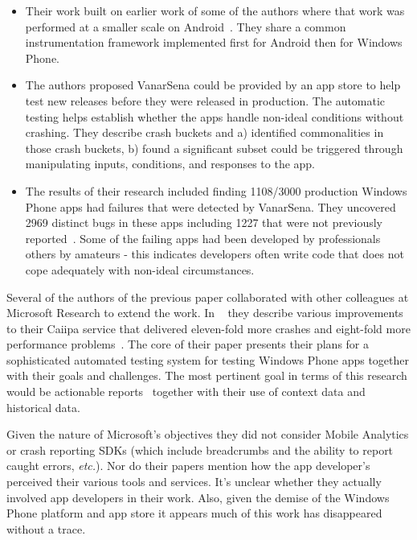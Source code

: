 \begin{itemize}
    \item Their work built on earlier work of some of the authors where that work was performed at a smaller scale on Android~\cite{ravindrath2012_appinsight_mobile_app_performance_in_the_wild}. They share a common instrumentation framework implemented first for Android then for Windows Phone.
    \item The authors proposed VanarSena could be provided by an app store to help test new releases before they were released in production. The automatic testing helps establish whether the apps handle non-ideal conditions without crashing.
    They describe crash buckets and a) identified commonalities in those crash buckets, b) found a significant subset could be triggered through manipulating inputs, conditions, and responses to the app.
    \item The results of their research included finding 1108/3000 production Windows Phone apps had failures that were detected by VanarSena. They uncovered 2969 distinct bugs in these apps including 1227 that were not previously reported~\cite[p. 202]{ravindrath2014_automatic_and_scalable_fault_detection_for_mobile_apps}. Some of the failing apps had been developed by professionals others by amateurs - this indicates developers often write code that does not cope adequately with non-ideal circumstances.  
\end{itemize}

Several of the authors of the previous paper collaborated with other colleagues at Microsoft Research to extend the work. In ~\textcite{chandra2015_how_to_smash_the_next_billion_mobile_app_bugs} they describe various improvements to their Caiipa service that delivered eleven-fold more crashes and eight-fold more performance problems~\cite[pp. 37-38]{chandra2015_how_to_smash_the_next_billion_mobile_app_bugs}. The core of their paper presents their plans for a sophisticated automated testing system for testing Windows Phone apps together with their goals and challenges. The most pertinent goal in terms of this research would be actionable reports~\cite[p. 36]{chandra2015_how_to_smash_the_next_billion_mobile_app_bugs} together with their use of context data and historical data. 

Given the nature of Microsoft's objectives they did not consider Mobile Analytics or crash reporting SDKs (which include breadcrumbs and the ability to report caught errors, \emph{etc.}). Nor do their papers mention how the app developer's perceived their various tools and services. It's unclear whether they actually involved app developers in their work. Also, given the demise of the Windows Phone platform and app store it appears much of this work has disappeared without a trace.


